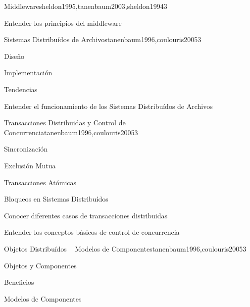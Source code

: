 \begin{syllabus}
\begin{unit}{Middleware}{sheldon1995,tanenbaum2003,sheldon1994}{3}
   \begin{learningoutcomes}
      \item Entender los principios del middleware
   \end{learningoutcomes}
\end{unit}

\begin{unit}{Sistemas Distribuídos de Archivos}{tanenbaum1996,coulouris2005}{3}
   \begin{topics}
      \item Diseño
      \item Implementación
      \item Tendencias
   \end{topics}

   \begin{learningoutcomes}
      \item Entender el funcionamiento de los Sistemas Distribuídos de Archivos
   \end{learningoutcomes}
\end{unit}

\begin{unit}{Transacciones Distribuidas y Control de Concurrencia}{tanenbaum1996,coulouris2005}{3}
   \begin{topics}
      \item Sincronización
      \item Exclusión Mutua
      \item Transacciones Atómicas
      \item Bloqueos en Sistemas Distribuídos
   \end{topics}

   \begin{learningoutcomes}
      \item Conocer diferentes casos de transacciones distribuidas
      \item Entender los conceptos básicos de control de concurrencia
      \item 
   \end{learningoutcomes}
\end{unit}

\begin{unit}{Objetos Distribuídos ~ Modelos de Componentes}{tanenbaum1996,coulouris2005}{3}
   \begin{topics}
      \item Objetos y Componentes
      \item Beneficios
      \item Modelos de Componentes
   \end{topics}


\end{unit}
\end{syllabus}
